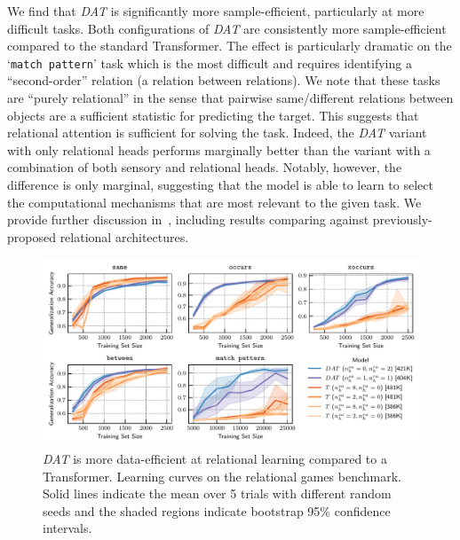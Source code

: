 We find that \textit{DAT} is significantly more sample-efficient, particularly at more difficult tasks. Both configurations of \textit{DAT} are consistently more sample-efficient compared to the standard Transformer. The effect is particularly dramatic on the `\texttt{match pattern}' task which is the most difficult and requires identifying a ``second-order'' relation (a relation between relations). We note that these tasks are ``purely relational'' in the sense that pairwise same/different relations between objects are a sufficient statistic for predicting the target. This suggests that relational attention is sufficient for solving the task. Indeed, the \textit{DAT} variant with only relational heads performs marginally better than the variant with a combination of both sensory and relational heads. Notably, however, the difference is only marginal, suggesting that the model is able to learn to select the computational mechanisms that are most relevant to the given task. We provide further discussion in~, including results comparing against previously-proposed relational architectures.


\begin{figure}
    \includegraphics[width=\textwidth]{figs/experiments/relgames/relgames_learning_curves_transformer_comparison.pdf}
    \caption{\textit{DAT} is more data-efficient at relational learning compared to a Transformer. Learning curves on the relational games benchmark. Solid lines indicate the mean over 5 trials with different random seeds and the shaded regions indicate bootstrap 95\% confidence intervals.}\label{fig:relgames_learning_curves}
\end{figure}


